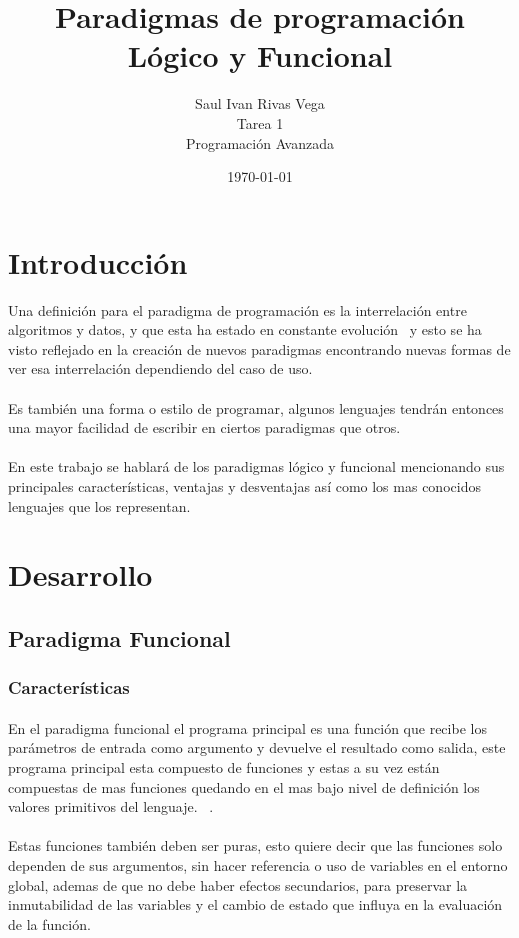 \documentclass[12pt]{article}
\title{Paradigmas de programación Lógico y Funcional}
\author{
	Saul Ivan Rivas Vega \\
	Tarea 1\\
	Programación Avanzada\\ 
}
\date{\today}
\begin{document}
	\maketitle
	
	\section{Introducción}
	Una definición para el paradigma de programación es la interrelación entre algoritmos y datos, y que esta ha estado en constante evolución~\cite{joyanes_aguilar_fundamentos_2008} y esto se ha visto reflejado en la creación de nuevos paradigmas encontrando nuevas formas de ver esa interrelación dependiendo del caso de uso.
	\paragraph{}
	Es también una forma o estilo de programar, algunos lenguajes tendrán entonces una mayor facilidad  de escribir en ciertos paradigmas que otros.~\cite{loyola_university}
	\paragraph{}
	En este trabajo se hablará de los paradigmas lógico y funcional mencionando sus principales características, ventajas y desventajas así como los mas conocidos lenguajes que los representan.
	\section{Desarrollo}\label{desarrollo}
	
	
	\subsection{Paradigma Funcional}
	\subsubsection{Características}
	\paragraph{}
	En el paradigma funcional el programa principal es una función que recibe los parámetros de entrada como argumento y devuelve el resultado como salida, este programa principal esta compuesto de funciones y estas a su vez están compuestas de mas funciones quedando en el mas bajo nivel de definición los valores primitivos del lenguaje. ~\cite{why_functional}.
	\paragraph{}
	Estas funciones también deben ser puras, esto quiere decir que las funciones solo dependen de sus argumentos, sin hacer referencia o uso de variables en el entorno global, ademas de que no debe haber efectos secundarios, para preservar la inmutabilidad de las variables y el cambio de estado que influya en la evaluación de la función. ~\cite{hack_fp}
\end{document}
